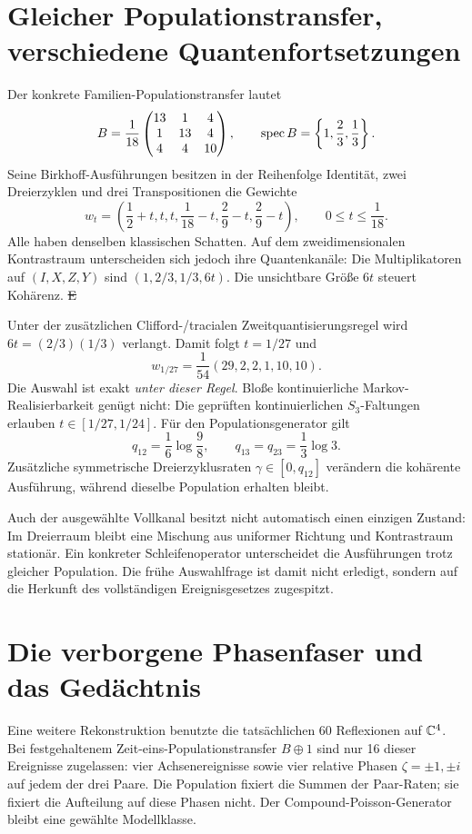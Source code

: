 \section{Gleicher Populationstransfer, verschiedene Quantenfortsetzungen}
Der konkrete Familien-Populationstransfer lautet
\[
 B=\frac1{18}\begin{pmatrix}13&1&4\\1&13&4\\4&4&10\end{pmatrix},
 \qquad\operatorname{spec} B=\left\{1,\frac23,\frac13\right\}.
\]
Seine Birkhoff-Ausführungen besitzen in der Reihenfolge Identität, zwei Dreierzyklen und drei Transpositionen die Gewichte
\[
 w_t=\left(\frac12+t,t,t,\frac1{18}-t,\frac29-t,\frac29-t\right),
 \qquad0\le t\le\frac1{18}.
\]
Alle haben denselben klassischen Schatten. Auf dem zweidimensionalen Kontrastraum unterscheiden sich jedoch ihre Quantenkanäle: Die Multiplikatoren auf $(I,X,Z,Y)$ sind $(1,2/3,1/3,6t)$. Die unsichtbare Größe $6t$ steuert Kohärenz. \st{E} 

Unter der zusätzlichen Clifford-/tracialen Zweitquantisierungsregel wird $6t=(2/3)(1/3)$ verlangt. Damit folgt $t=1/27$ und
\[
 w_{1/27}=\frac1{54}(29,2,2,1,10,10).
\]
Die Auswahl ist exakt \emph{unter dieser Regel}. Bloße kontinuierliche Markov-Realisierbarkeit genügt nicht: Die geprüften kontinuierlichen $S_3$-Faltungen erlauben $t\in[1/27,1/24]$. Für den Populationsgenerator gilt
\[
 q_{12}=\frac16\log\frac98,\qquad
 q_{13}=q_{23}=\frac13\log3.
\]
Zusätzliche symmetrische Dreierzyklusraten $\gamma\in[0,q_{12}]$ verändern die kohärente Ausführung, während dieselbe Population erhalten bleibt. 

Auch der ausgewählte Vollkanal besitzt nicht automatisch einen einzigen Zustand: Im Dreierraum bleibt eine Mischung aus uniformer Richtung und Kontrastraum stationär. Ein konkreter Schleifenoperator unterscheidet die Ausführungen trotz gleicher Population. Die frühe Auswahlfrage ist damit nicht erledigt, sondern auf die Herkunft des vollständigen Ereignisgesetzes zugespitzt.

\section{Die verborgene Phasenfaser und das Gedächtnis}
Eine weitere Rekonstruktion benutzte die tatsächlichen 60 Reflexionen auf $\mathbb C^4$. Bei festgehaltenem Zeit-eins-Populationstransfer $B\oplus1$ sind nur 16 dieser Ereignisse zugelassen: vier Achsenereignisse sowie vier relative Phasen $\zeta=\pm1,\pm i$ auf jedem der drei Paare. Die Population fixiert die Summen der Paar-Raten; sie fixiert die Aufteilung auf diese Phasen nicht. Der Compound-Poisson-Generator bleibt eine gewählte Modellklasse. 

